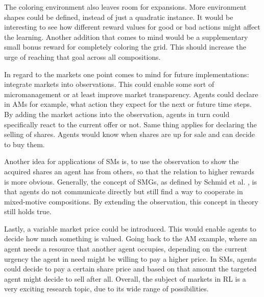 The coloring environment also leaves room for expansions. More environment shapes could be defined, instead of just a quadratic instance. It would be interesting to see how different reward values for good or bad actions might affect the learning. Another addition that comes to mind would be a supplementary small bonus reward for completely coloring the grid. This should increase the urge of reaching that goal across all compositions.

In regard to the markets one point comes to mind for future implementations: integrate markets into observations. This could enable some sort of micromanagement or at least improve market transparency. Agents could declare in AMs for example, what action they expect for the next or future time steps. By adding the market actions into the observation, agents in turn could specifically react to the current offer or not. Same thing applies for declaring the selling of shares. Agents would know when shares are up for sale and can decide to buy them. 

Another idea for applications of SMs is, to use the observation to show the acquired shares an agent has from others, so that the relation to higher rewards is more obvious. Generally, the concept of SMGs, as defined by Schmid et al. \cite{scbe21}, is that agents do not communicate directly but still find a way to cooperate in mixed-motive compositions. By extending the observation, this concept in theory still holds true.

Lastly, a variable market price could be introduced. This would enable agents to decide how much something is valued. Going back to the AM example, where an agent needs a resource that another agent occupies, depending on the current urgency the agent in need might be willing to pay a higher price. In SMs, agents could decide to pay a certain share price and based on that amount the targeted agent might decide to sell after all. Overall, the subject of markets in RL is a very exciting research topic, due to its wide range of possibilities.